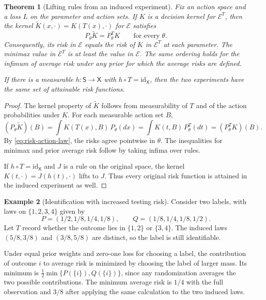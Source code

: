 \documentclass[11pt,oneside]{book}
\newtheorem{theorem}{Theorem}[chapter]
\theoremstyle{definition}
\newtheorem{example}[theorem]{Example}
\theoremstyle{remark}
\begin{document}
\begin{theorem}[Lifting rules from an induced experiment]
\label{thm:statistic-risk-lifting}
Fix an action space and a loss $L$ on the parameter and action sets.
If $K$ is a decision kernel for $\mathcal E^T$, then the kernel
$\widetilde K(x,\cdot)=K(T(x),\cdot)$ for $\mathcal E$ satisfies
\[
P_\theta\widetilde K=P_\theta^T K
\qquad\text{for every }\theta.
\]
Consequently, its risk in $\mathcal E$ equals the risk of $K$
in $\mathcal E^T$ at each parameter. The minimax value in
$\mathcal E^T$ is at least the value in $\mathcal E$. The same
ordering holds for the infimum of average risk under any prior
for which the average risks are defined.

If there is a measurable $h:\mathsf S\to\mathsf X$ with
$h\circ T=\mathrm{id}_{\mathsf X}$, then the two experiments
have the same set of attainable risk functions.
\end{theorem}
\begin{proof}
The kernel property of $\widetilde K$ follows from measurability
of $T$ and of the action probabilities under $K$. For each
measurable action set $B$,
\[
(P_\theta\widetilde K)(B)
=\int K(T(x),B)\,P_\theta(dx)
=\int K(t,B)\,P_\theta^T(dt)
=(P_\theta^T K)(B).
\]
By \eqref{eq:risk-action-law}, the risks agree pointwise in
$\theta$. The inequalities for minimax and prior average risk
follow by taking infima over rules.

If $h\circ T=\mathrm{id}_{\mathsf X}$ and $J$ is a rule on the
original space, the kernel $K(t,\cdot)=J(h(t),\cdot)$ lifts to
$J$. Thus every original risk function is attained in the
induced experiment as well.
\end{proof}

\begin{example}[Identification with increased testing risk]
\label{ex:statistic-increased-testing-risk}
Consider two labels, with laws on $\{1,2,3,4\}$ given by
\[
P=(1/2,1/8,1/4,1/8),\qquad Q=(1/8,1/4,1/8,1/2).
\]
Let $T$ record whether the outcome lies in $\{1,2\}$ or
$\{3,4\}$. The induced laws $(5/8,3/8)$ and $(3/8,5/8)$
are distinct, so the label is still identifiable.

Under equal prior weights and zero-one loss for choosing a label,
the contribution of outcome $i$ to average risk is minimized
by choosing the label of larger mass. Its minimum is
$\tfrac12\min\{P(\{i\}),Q(\{i\})\}$, since any randomization
averages the two possible contributions. The minimum average
risk is $1/4$ with the full observation and $3/8$ after applying
the same calculation to the two induced laws.
\end{example}
\end{document}
